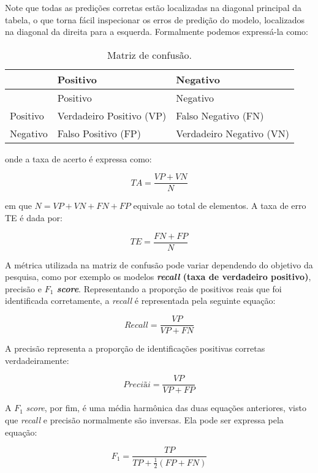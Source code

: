 \documentclass[
  openany]{book}
\begin{document}
Note que todas as predições corretas estão localizadas na diagonal principal da tabela, o que torna fácil inspecionar os erros de predição do modelo, localizados na diagonal da direita para a esquerda. Formalmente podemos expressá-la como:

\begin{longtable}[]{@{}lll@{}}
\caption{\label{tab:matrizconfu} Matriz de confusão.}\tabularnewline
\toprule
& Positivo & Negativo\tabularnewline
\midrule
\endfirsthead
\toprule
& Positivo & Negativo\tabularnewline
\midrule
\endhead
Positivo & Verdadeiro Positivo (VP) & Falso Negativo (FN)\tabularnewline
Negativo & Falso Positivo (FP) & Verdadeiro Negativo (VN)\tabularnewline
\bottomrule
\end{longtable}

onde a taxa de acerto é expressa como:

\begin{equation}
TA = \frac{VP+VN}{N}
\label{eq:TA}
\end{equation}

em que \(N=VP+VN+FN+FP\) equivale ao total de elementos. A taxa de erro TE é dada por:

\begin{equation}
TE=\frac{FN+FP}{N}
\label{eq:TE}
\end{equation}

A métrica utilizada na matriz de confusão pode variar dependendo do objetivo da pesquisa, como por exemplo os modelos \textbf{\emph{recall} (taxa de verdadeiro positivo)}, precisão e \textbf{\(F_1\) \emph{score}}. Representando a proporção de positivos reais que foi identificada corretamente, a \emph{recall} é representada pela seguinte equação:

\begin{equation}
Recall=\frac{VP}{VP+FN}
\label{eq:recall}
\end{equation}

A precisão representa a proporção de identificações positivas corretas verdadeiramente:

\begin{equation}
Preciãi=\frac{VP}{VP+FP}
\label{eq:precision}
\end{equation}

A \(F_1\) \emph{score}, por fim, é uma média harmônica das duas equações anteriores, visto que \emph{recall} e precisão normalmente são inversas. Ela pode ser expressa pela equação:

\begin{equation}
F_1=\frac{TP}{TP+\frac{1}{2}(FP+FN)}
\label{eq:f1score}
\end{equation}
\end{document}

